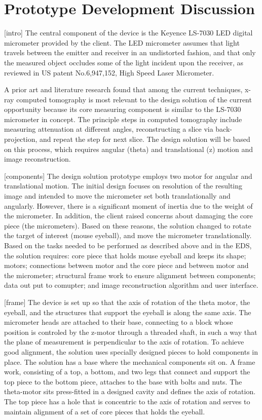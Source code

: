 \documentclass{article}
\begin{document}
\section{Prototype Development Discussion}
\label{sec:prot-devel-disc}
[intro]
	The central component of the device is the Keyence LS-7030 LED digital micrometer provided by 
the client. The LED micrometer assumes that light travels between the emitter and receiver in an 
undistorted fashion, and that only the measured object occludes some of the light incident upon the 
receiver, as reviewed in US patent No.6,947,152, High Speed Laser Micrometer. 
	
	A prior art and literature research found that among the current techniques, x-ray computed 
tomography is most relevant to the design solution of the current opportunity because its core measuring 
component is similar to the LS-7030 micrometer in concept. The principle steps in computed tomography 
include measuring attenuation at different angles, reconstructing a slice via back-projection, and repeat the 
step for next slice. The design solution will be based on this process, which requires angular (theta) and 
translational (z) motion and image reconstruction. 

[components]
	The design solution prototype employs two motor for angular and translational motion. The initial 
design focuses on resolution of the resulting image and intended to move the micrometer set both 
translationally and angularly. However, there is a significant moment of inertia due to the weight of the 
micrometer. In addition, the client raised concerns about damaging the core piece (the micrometers). 
Based on these reasons, the solution changed to rotate the target of interest (mouse eyeball), and move 
the micrometer translationally. Based on the tasks needed to be performed as described above and in the 
EDS, the solution requires: core piece that holds mouse eyeball and keeps its shape; motors; connections 
between motor and the core piece and between motor and the micrometer; structural frame work to ensure 
alignment between components; data out put to comupter; and image reconstruction algorithm and user 
interface. 

[frame]
	The device is set up so that the axis of rotation of the theta motor, the eyeball, and the structures 
that support the eyeball is along the same axis. The micrometer heads are attached to their base, 
connecting to a block whose position is controled by the z-motor through a threaded shaft, in such a way 
that the plane of measurement is perpendicular to the axis of rotation. To achieve good alignment, the 
solution uses specially designed pieces to hold components in place. The solution has a base where the 
mechanical components sit on. A frame work, consisting of a top, a bottom, and two legs that connect and 
support the top piece to the bottom piece, attaches to the base with bolts and nuts. The theta-motor sits 
press-fitted in a designed cavity and defines the axis of rotation. The top piece has a hole that is concentric 
to the axis of rotation and serves to maintain alignment of a set of core pieces that holds the eyeball. 
\end{document}

